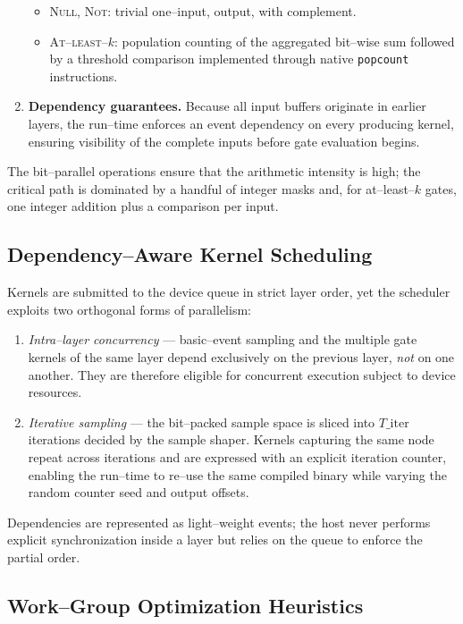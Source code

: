\begin{enumerate}
\begin{itemize}
          \item \textsc{Null}, \textsc{Not}: trivial one--input, output, with complement.
          \item \textsc{At--least--$k$}: population counting of the aggregated
                bit--wise sum followed by a threshold comparison implemented
                through native \texttt{popcount} instructions.
        \end{itemize}
  \item \textbf{Dependency guarantees.}  Because all input buffers originate in
        earlier layers, the run--time enforces an event dependency on every
        producing kernel, ensuring visibility of the complete inputs before
        gate evaluation begins.
\end{enumerate}
The bit--parallel operations ensure that the arithmetic intensity is high; the
critical path is dominated by a handful of integer masks and, for
at--least--$k$ gates, one integer addition plus a comparison per input.

\subsection{Dependency--Aware Kernel Scheduling}
\label{subsec:scheduling}

Kernels are submitted to the device queue in strict layer order, yet the
scheduler exploits two orthogonal forms of parallelism:
\begin{enumerate}
  \item \emph{Intra--layer concurrency} --- basic--event sampling and the
        multiple gate kernels of the same layer depend exclusively on the
        previous layer, \emph{not} on one another.  They are therefore eligible
        for concurrent execution subject to device resources.
  \item \emph{Iterative sampling} --- the bit--packed sample space is sliced
        into $T\_\text{iter}$ iterations decided by the sample shaper.
        Kernels capturing the same node repeat across iterations and are
        expressed with an explicit iteration counter, enabling the run--time to
        re--use the same compiled binary while varying the random counter seed
        and output offsets.
\end{enumerate}
Dependencies are represented as light--weight events; the host never performs
explicit synchronization inside a layer but relies on the queue to enforce the
partial order.

\subsection{Work--Group Optimization Heuristics}
\label{subsec:wg_optim}

